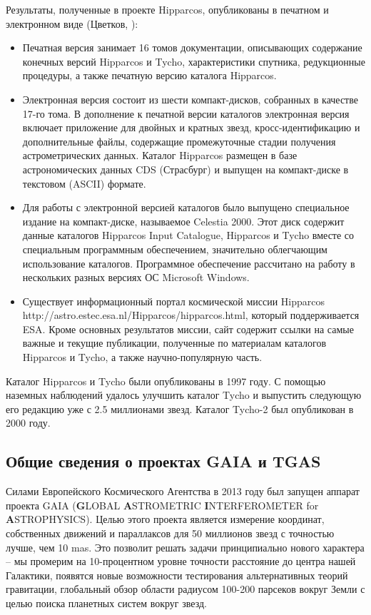 \documentclass[14pt]{article} %
\begin{document}
Результаты, полученные в проекте Hipparcos, опубликованы в печатном и электронном виде (Цветков, \cite{book:hipparcos}):

\begin{itemize}

\item Печатная версия занимает 16 томов документации, описывающих содержание конечных версий Hipparcos и Tycho, характеристики спутника, редукционные процедуры, а также печатную версию каталога Hipparcos.

\item Электронная версия состоит из шести компакт-дисков, собранных в качестве 17-го тома. В дополнение к печатной версии каталогов электронная версия включает приложение для двойных и кратных звезд, кросс-идентификацию и дополнительные файлы, содержащие промежуточные стадии получения астрометрических данных. Каталог Hipparcos размещен в базе астрономических данных CDS (Страсбург) и выпущен на компакт-диске в текстовом (ASCII) формате.

\item Для работы с электронной версией каталогов было выпущено специальное издание на компакт-диске, называемое Celestia 2000. Этот диск содержит данные каталогов Hipparcos Input Catalogue, Hipparcos и Tycho вместе со специальным программным обеспечением, значительно облегчающим использование каталогов. Программное обеспечение рассчитано на работу в нескольких разных версиях ОС Microsoft Windows.

\item Существует информационный портал космической миссии Hipparcos http://astro.estec.esa.nl/Hipparcos/hipparcos.html, который поддерживается ESA. Кроме основных результатов миссии, сайт содержит ссылки на самые важные и текущие публикации, полученные по материалам каталогов Hipparcos и Tycho, а также научно-популярную часть.

\end{itemize}

Каталог Hipparcos и Tycho были опубликованы в 1997 году. С помощью наземных наблюдений удалось улучшить каталог Tycho и выпустить следующую его редакцию уже с 2.5 миллионами звезд. Каталог Tycho-2 был опубликован в 2000 году.

\subsection{Общие сведения о проектах GAIA и TGAS}\label{sub:smthgaia}

Силами Европейского Космического Агентства в 2013 году был запущен  аппарат проекта GAIA (\textbf{G}LOBAL \textbf{A}STROMETRIC \textbf{I}NTERFEROMETER for \textbf{A}STROPHYSICS). Целью этого проекта является измерение координат, собственных движений и параллаксов для 50 миллионов звезд с точностью лучше, чем 10 mas. Это позволит решать задачи принципиально нового характера -- мы промерим на 10-процентном уровне точности расстояние до центра нашей Галактики, появятся новые возможности тестирования альтернативных теорий гравитации, глобальный обзор области радиусом 100-200 парсеков вокруг Земли с целью поиска планетных систем вокруг звезд.
\end{document}
